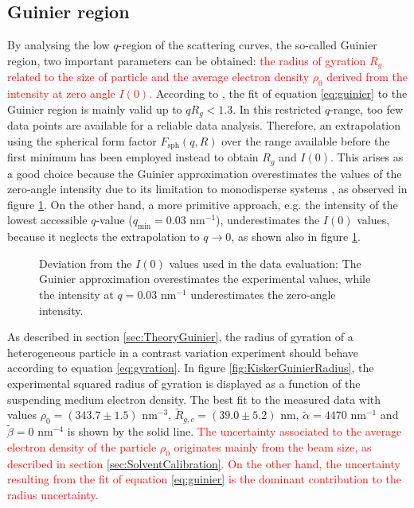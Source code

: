 \subsection{Guinier region}
\label{sec:guinier_analysis}
By analysing the low \(q \)-region of the scattering curves, the so-called Guinier region, two important parameters can be obtained: \textcolor{red}{the radius of gyration \(R_g\) related to the size of particle and the average electron density $\rho_0$ derived from the intensity at zero angle \(I(0)\).} According to \cite{feigin_structure_1987}, the fit of equation \ref{eq:guinier} to the Guinier region is mainly valid up to \( qR_g<1.3 \). In this restricted \(q\)-range, too few data points are available for a reliable data analysis. Therefore, an extrapolation using the spherical form factor \( F_{\text{sph}}(q,R) \) over the range available before the first minimum has been employed instead to obtain \(R_g\) and \(I(0)\). This arises as a good choice because the Guinier approximation overestimates the values of the zero-angle intensity due to its limitation to monodisperse systems \citep{feigin_structure_1987}, as observed in figure \ref{fig:KiskerIntensityComparison}. On the other hand, a more primitive approach, e.g. the intensity of the lowest accessible $q$-value ($q_{\text{min}}=0.03$ nm$^{-1}$), underestimates the $I(0)$ values, because it neglects the extrapolation to $q\rightarrow0$, as shown also in figure \ref{fig:KiskerIntensityComparison}.

\begin{figure}%
	\centering
		
		\caption[Deviation from the $I(0)$ used in the evaluation of the PS-COOH particles experimental data.]{Deviation from the $I(0)$ values used in the data evaluation: The Guinier approximation overestimates the experimental values, while the intensity at $q=0.03$ nm$^{-1}$ underestimates the zero-angle intensity.}
		\label{fig:KiskerIntensityComparison}
\end{figure}

As described in section \ref{sec:TheoryGuinier}, the radius of gyration of a heterogeneous particle in a contrast variation experiment should behave according to equation \ref{eq:gyration}. In figure \ref{fig:KiskerGuinierRadius}, the experimental squared radius of gyration is displayed as a function of the suspending medium electron density. The best fit to the measured data with values \(\rho_0=\left(343.7\pm1.5\right)\) nm\(^{-3}\), \( \tilde R_{g,c}=\left(39.0\pm5.2\right)\) nm, \(\tilde \alpha=4470\) nm\(^{-1}\) and \(\tilde\beta=0\) nm\(^{-4}\) is shown by the solid line. \textcolor{red}{The uncertainty associated to the average electron density of the particle $\rho_0$ originates mainly from the beam size, as described in section \ref{sec:SolventCalibration}. On the other hand, the uncertainty resulting from the fit of equation \ref{eq:guinier} is the dominant contribution to the radius uncertainty.}

